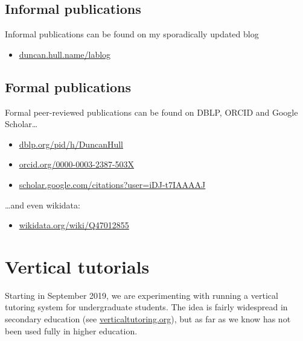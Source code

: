 \documentclass[12pt,]{book}
\providecommand{\tightlist}{%
  \setlength{\itemsep}{0pt}\setlength{\parskip}{0pt}}
\begin{document}
\hypertarget{informal-publications}{%
\section{Informal publications}\label{informal-publications}}

Informal publications can be found on my sporadically updated blog

\begin{itemize}
\tightlist
\item
  \href{https://duncan.hull.name/lablog/}{duncan.hull.name/lablog}
\end{itemize}

\hypertarget{formal-publications}{%
\section{Formal publications}\label{formal-publications}}

Formal peer-reviewed publications can be found on DBLP, ORCID and Google Scholar\ldots{}

\begin{itemize}
\tightlist
\item
  \href{https://dblp.org/pid/h/DuncanHull}{dblp.org/pid/h/DuncanHull}
\item
  \href{https://orcid.org/0000-0003-2387-503X}{orcid.org/0000-0003-2387-503X}
\item
  \href{https://scholar.google.com/citations?user=iDJ-t7IAAAAJ}{scholar.google.com/citations?user=iDJ-t7IAAAAJ}
\end{itemize}

\ldots{}and even wikidata:

\begin{itemize}
\tightlist
\item
  \href{https://www.wikidata.org/wiki/Q47012855}{wikidata.org/wiki/Q47012855}
\end{itemize}

\hypertarget{vertical}{%
\chapter{Vertical tutorials}\label{vertical}}

Starting in September 2019, we are experimenting with running a vertical tutoring system for undergraduate students. The idea is fairly widespread in secondary education (see \href{https://www.verticaltutoring.org/}{verticaltutoring.org}), but as far as we know has not been used fully in higher education.
\end{document}
